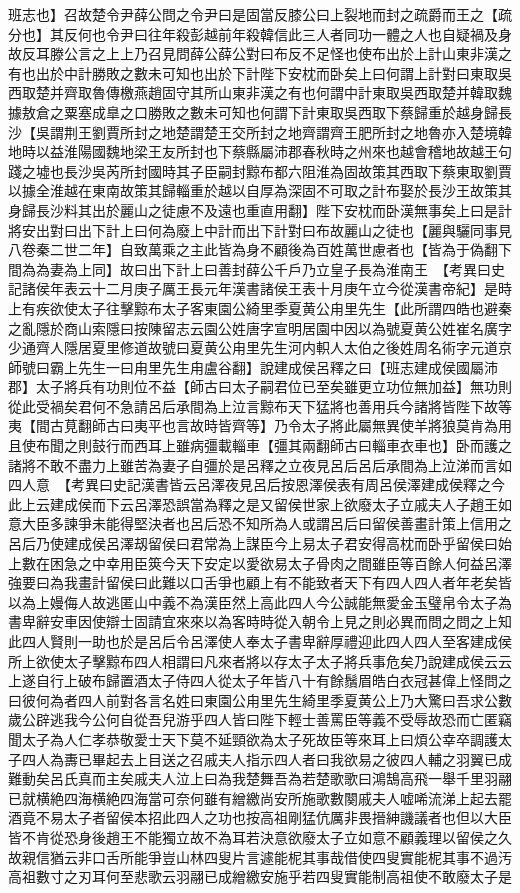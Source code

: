 班志也】召故楚令尹薛公問之令尹曰是固當反膝公曰上裂地而封之疏爵而王之【疏分也】其反何也令尹曰往年殺彭越前年殺韓信此三人者同功一體之人也自疑禍及身故反耳滕公言之上上乃召見問薛公薛公對曰布反不足怪也使布出於上計山東非漢之有也出於中計勝敗之數未可知也出於下計陛下安枕而卧矣上曰何謂上計對曰東取吳西取楚并齊取魯傳檄燕趙固守其所山東非漢之有也何謂中計東取吳西取楚并韓取魏據敖倉之粟塞成臯之口勝敗之數未可知也何謂下計東取吳西取下蔡歸重於越身歸長沙【吳謂荆王劉賈所封之地楚謂楚王交所封之地齊謂齊王肥所封之地魯亦入楚境韓地時以益淮陽國魏地梁王友所封也下蔡縣屬沛郡春秋時之州來也越會稽地故越王句踐之墟也長沙吳芮所封國時其子臣嗣封黥布都六阻淮為固故策其西取下蔡東取劉賈以據全淮越在東南故策其歸輜重於越以自厚為深固不可取之計布娶於長沙王故策其身歸長沙料其出於麗山之徒慮不及遠也重直用翻】陛下安枕而卧漢無事矣上曰是計將安出對曰出下計上曰何為廢上中計而出下計對曰布故麗山之徒也【麗與驪同事見八卷秦二世二年】自致萬乘之主此皆為身不顧後為百姓萬世慮者也【皆為于偽翻下間為為妻為上同】故曰出下計上曰善封薛公千戶乃立皇子長為淮南王　【考異曰史記諸侯年表云十二月庚子厲王長元年漢書諸侯王表十月庚午立今從漢書帝紀】是時上有疾欲使太子往擊黥布太子客東園公綺里季夏黄公甪里先生【此所謂四皓也避秦之亂隱於商山索隱曰按陳留志云園公姓唐字宣明居園中因以為號夏黄公姓崔名廣字少通齊人隱居夏里修道故號曰夏黄公甪里先生河内軹人太伯之後姓周名術字元道京師號曰霸上先生一曰甪里先生甪盧谷翻】說建成侯呂釋之曰【班志建成侯國屬沛郡】太子將兵有功則位不益【師古曰太子嗣君位已至矣雖更立功位無加益】無功則從此受禍矣君何不急請呂后承間為上泣言黥布天下猛將也善用兵今諸將皆陛下故等夷【間古莧翻師古曰夷平也言故時皆齊等】乃令太子將此屬無異使羊將狼莫肯為用且使布聞之則鼓行而西耳上雖病彊載輜車【彊其兩翻師古曰輜車衣車也】卧而護之諸將不敢不盡力上雖苦為妻子自彊於是呂釋之立夜見呂后呂后承間為上泣涕而言如四人意　【考異曰史記漢書皆云呂澤夜見呂后按恩澤侯表有周呂侯澤建成侯釋之今此上云建成侯而下云呂澤恐誤當為釋之是又留侯世家上欲廢太子立戚夫人子趙王如意大臣多諫爭未能得堅決者也呂后恐不知所為人或謂呂后曰留侯善畫計策上信用之呂后乃使建成侯呂澤刼留侯曰君常為上謀臣今上易太子君安得高枕而卧乎留侯曰始上數在困急之中幸用臣筴今天下安定以愛欲易太子骨肉之間雖臣等百餘人何益呂澤強要曰為我畫計留侯曰此難以口舌爭也顧上有不能致者天下有四人四人者年老矣皆以為上嫚侮人故逃匿山中義不為漢臣然上高此四人今公誠能無愛金玉璧帛令太子為書卑辭安車因使辯士固請宜來來以為客時時從入朝令上見之則必異而問之問之上知此四人賢則一助也於是呂后令呂澤使人奉太子書卑辭厚禮迎此四人四人至客建成侯所上欲使太子擊黥布四人相謂曰凡來者將以存太子太子將兵事危矣乃說建成侯云云上遂自行上破布歸置酒太子侍四人從太子年皆八十有餘鬚眉皓白衣冠甚偉上怪問之曰彼何為者四人前對各言名姓曰東園公甪里先生綺里季夏黄公上乃大驚曰吾求公數歲公辟逃我今公何自從吾兒游乎四人皆曰陛下輕士善罵臣等義不受辱故恐而亡匿竊聞太子為人仁孝恭敬愛士天下莫不延頸欲為太子死故臣等來耳上曰煩公幸卒調護太子四人為夀已畢起去上目送之召戚夫人指示四人者曰我欲易之彼四人輔之羽翼已成難動矣呂氏真而主矣戚夫人泣上曰為我楚舞吾為若楚歌歌曰鴻鵠高飛一舉千里羽翮已就横絶四海横絶四海當可奈何雖有繒繳尚安所施歌數闋戚夫人嘘唏流涕上起去罷酒竟不易太子者留侯本招此四人之功也按高祖剛猛伉厲非畏搢紳譏議者也但以大臣皆不肯從恐身後趙王不能獨立故不為耳若決意欲廢太子立如意不顧義理以留侯之久故親信猶云非口舌所能爭豈山林四叟片言遽能柅其事哉借使四叟實能柅其事不過汚高祖數寸之刃耳何至悲歌云羽翮已成繒繳安施乎若四叟實能制高祖使不敢廢太子是